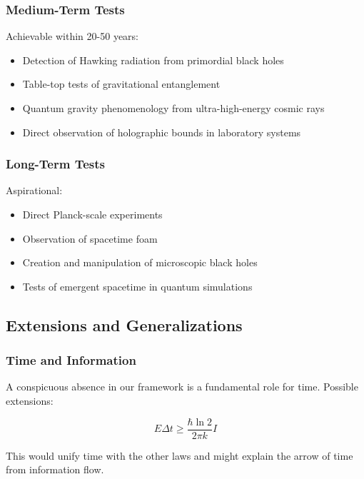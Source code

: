 \documentclass[11pt,a4paper]{article}
\theoremstyle{plain}
\theoremstyle{definition}
\theoremstyle{remark}
\begin{document}
\subsubsection{Medium-Term Tests}

Achievable within 20-50 years:

\begin{itemize}[leftmargin=*]
\item Detection of Hawking radiation from primordial black holes
\item Table-top tests of gravitational entanglement
\item Quantum gravity phenomenology from ultra-high-energy cosmic rays
\item Direct observation of holographic bounds in laboratory systems
\end{itemize}

\subsubsection{Long-Term Tests}

Aspirational:

\begin{itemize}[leftmargin=*]
\item Direct Planck-scale experiments
\item Observation of spacetime foam
\item Creation and manipulation of microscopic black holes
\item Tests of emergent spacetime in quantum simulations
\end{itemize}

\subsection{Extensions and Generalizations}

\subsubsection{Time and Information}

A conspicuous absence in our framework is a fundamental role for time. Possible extensions:

\begin{equation}
E\Delta t \geq \frac{\hbar\ln 2}{2\pi k}I
\end{equation}

This would unify time with the other laws and might explain the arrow of time from information flow.
\end{document}

